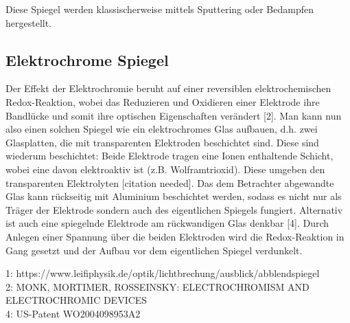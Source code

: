 \documentclass[11pt]{article}
\begin{document}
Diese Spiegel werden klassischerweise mittels Sputtering oder Bedampfen hergestellt.
\subsection{Elektrochrome Spiegel}
Der Effekt der Elektrochromie beruht auf einer reversiblen elektrochemischen Redox-Reaktion, wobei das Reduzieren und Oxidieren einer Elektrode ihre Bandlücke und somit ihre optischen Eigenschaften verändert [2]. Man kann nun also einen solchen Spiegel wie ein elektrochromes Glas aufbauen, d.h. zwei Glasplatten, die mit transparenten Elektroden beschichtet sind. Diese sind wiederum beschichtet: Beide Elektrode tragen eine Ionen enthaltende Schicht, wobei eine davon elektroaktiv ist (z.B. Wolframtrioxid). Diese umgeben den transparenten Elektrolyten [citation needed]. Das dem Betrachter abgewandte Glas kann rückseitig mit Aluminium beschichtet werden, sodass es nicht nur als Träger der Elektrode sondern auch des eigentlichen Spiegels fungiert. Alternativ ist auch eine spiegelnde Elektrode am rückwandigen Glas denkbar [4]. Durch Anlegen einer Spannung über die beiden Elektroden wird die Redox-Reaktion in Gang gesetzt und der Aufbau vor dem eigentlichen Spiegel verdunkelt.

1: https://www.leifiphysik.de/optik/lichtbrechung/ausblick/abblendspiegel\\
2: MONK, MORTIMER, ROSSEINSKY: ELECTROCHROMISM AND ELECTROCHROMIC DEVICES\\
4: US-Patent WO2004098953A2
\end{document}
